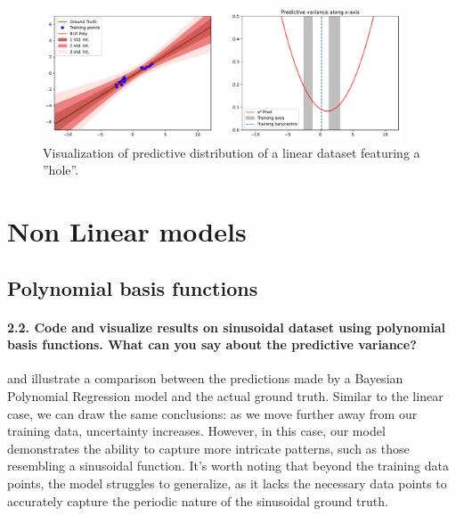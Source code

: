 \begin{figure}[H]
    \centering
    \includegraphics[width=0.95\textwidth]{phi_linear_hole.pdf}
    \caption{Visualization of predictive distribution of a linear dataset featuring a ''hole''.}
    \label{fig:phi_linear_hole}
\end{figure}

\section{Non Linear models}

\subsection{Polynomial basis functions}

\paragraph*{2.2. Code and visualize results on sinusoidal dataset using polynomial basis functions. What can you say about the predictive variance?}

 and  illustrate a comparison between the predictions made by a Bayesian Polynomial Regression model and the actual ground truth. Similar to the linear case, we can draw the same conclusions: as we move further away from our training data, uncertainty increases. However, in this case, our model demonstrates the ability to capture more intricate patterns, such as those resembling a sinusoidal function. It's worth noting that beyond the training data points, the model struggles to generalize, as it lacks the necessary data points to accurately capture the periodic nature of the sinusoidal ground truth.

